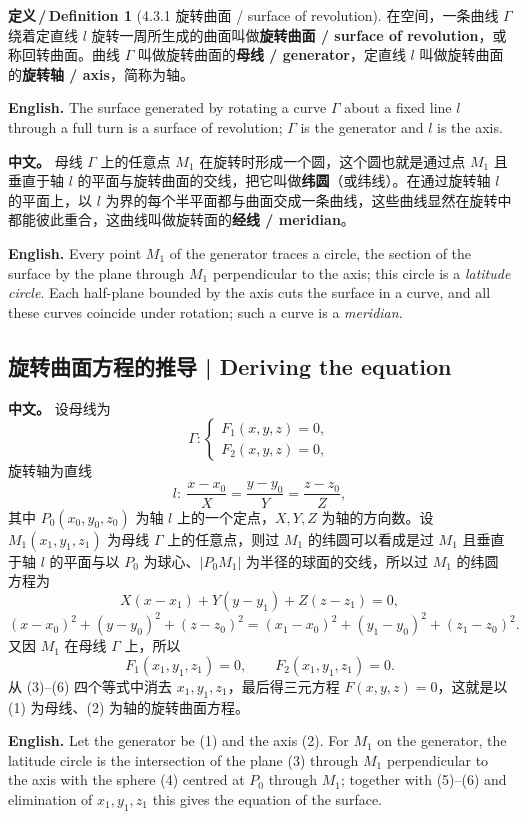 \documentclass[UTF8,11pt,a4paper]{ctexart}
\newcommand{\APS}[2]{\par\noindent\textbf{中文。} #1\par\noindent\textbf{English.} #2\par\smallskip}
\newcommand{\EN}[1]{\par\noindent \textbf{English.} #1\par}
\theoremstyle{definition}
\newtheorem*{definition}{定义\,/\,Definition}
\begin{document}
\begin{definition}[4.3.1 旋转曲面 / surface of revolution]\label{def:revolution}
在空间，一条曲线 $\Gamma$ 绕着定直线 $l$ 旋转一周所生成的曲面叫做\textbf{旋转曲面 / surface of revolution}，或称回转曲面。曲线 $\Gamma$ 叫做旋转曲面的\textbf{母线 / generator}，定直线 $l$ 叫做旋转曲面的\textbf{旋转轴 / axis}，简称为轴。
\EN{The surface generated by rotating a curve $\Gamma$ about a fixed line $l$ through a full turn is a surface of revolution; $\Gamma$ is the generator and $l$ is the axis.}
\end{definition}

\APS{母线 $\Gamma$ 上的任意点 $M_1$ 在旋转时形成一个圆，这个圆也就是通过点 $M_1$ 且垂直于轴 $l$ 的平面与旋转曲面的交线，把它叫做\textbf{纬圆}（或纬线）。在通过旋转轴 $l$ 的平面上，以 $l$ 为界的每个半平面都与曲面交成一条曲线，这些曲线显然在旋转中都能彼此重合，这曲线叫做旋转面的\textbf{经线 / meridian}。}{Every point $M_1$ of the generator traces a circle, the section of the surface by the plane through $M_1$ perpendicular to the axis; this circle is a \emph{latitude circle}. Each half-plane bounded by the axis cuts the surface in a curve, and all these curves coincide under rotation; such a curve is a \emph{meridian}.}

\subsection{旋转曲面方程的推导 | Deriving the equation}
\APS{设母线为
\[
\Gamma:\begin{cases}F_1(x,y,z)=0,\\ F_2(x,y,z)=0,\end{cases}\tag{1}
\]
旋转轴为直线
\[
l:\ \frac{x-x_0}{X}=\frac{y-y_0}{Y}=\frac{z-z_0}{Z},\tag{2}
\]
其中 $P_0(x_0,y_0,z_0)$ 为轴 $l$ 上的一个定点，$X,Y,Z$ 为轴的方向数。设 $M_1(x_1,y_1,z_1)$ 为母线 $\Gamma$ 上的任意点，则过 $M_1$ 的纬圆可以看成是过 $M_1$ 且垂直于轴 $l$ 的平面与以 $P_0$ 为球心、$|P_0M_1|$ 为半径的球面的交线，所以过 $M_1$ 的纬圆方程为
\[
X(x-x_1)+Y(y-y_1)+Z(z-z_1)=0,\tag{3}
\]
\[
(x-x_0)^2+(y-y_0)^2+(z-z_0)^2=(x_1-x_0)^2+(y_1-y_0)^2+(z_1-z_0)^2.\tag{4}
\]
又因 $M_1$ 在母线 $\Gamma$ 上，所以
\[
F_1(x_1,y_1,z_1)=0,\qquad F_2(x_1,y_1,z_1)=0.\tag{5--6}
\]
从 (3)--(6) 四个等式中消去 $x_1,y_1,z_1$，最后得三元方程 $F(x,y,z)=0$，这就是以 (1) 为母线、(2) 为轴的旋转曲面方程。}{Let the generator be (1) and the axis (2). For $M_1$ on the generator, the latitude circle is the intersection of the plane (3) through $M_1$ perpendicular to the axis with the sphere (4) centred at $P_0$ through $M_1$; together with (5)--(6) and elimination of $x_1,y_1,z_1$ this gives the equation of the surface.}
\end{document}
